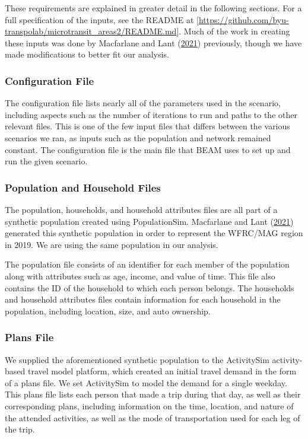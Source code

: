 \documentclass[
]{article}
\begin{document}
These requirements are explained in greater detail in the following sections. For a full specification of the inputs, see the README at {[}\url{https://github.com/byu-transpolab/microtransit_areas2/README.md}{]}. Much of the work in creating these inputs was done by Macfarlane and Lant (\protect\hyperlink{ref-MacfarlaneLant}{2021}) previously, though we have made modifications to better fit our analysis.

\hypertarget{configuration-file}{%
\subsubsection{Configuration File}\label{configuration-file}}

The configuration file lists nearly all of the parameters used in the scenario, including aspects such as the number of iterations to run and paths to the other relevant files. This is one of the few input files that differs between the various scenarios we ran, as inputs such as the population and network remained constant. The configuration file is the main file that BEAM uses to set up and run the given scenario.

\hypertarget{population-and-household-files}{%
\subsubsection{Population and Household Files}\label{population-and-household-files}}

The population, households, and household attributes files are all part of a synthetic population created using PopulationSim. Macfarlane and Lant (\protect\hyperlink{ref-MacfarlaneLant}{2021}) generated this synthetic population in order to represent the WFRC/MAG region in 2019. We are using the same population in our analysis.

The population file consists of an identifier for each member of the population along with attributes such as age, income, and value of time. This file also contains the ID of the household to which each person belongs. The households and household attributes files contain information for each household in the population, including location, size, and auto ownership.

\hypertarget{plans-file}{%
\subsubsection{Plans File}\label{plans-file}}

We supplied the aforementioned synthetic population to the ActivitySim activity-based travel model platform, which created an initial travel demand in the form of a plans file. We set ActivitySim to model the demand for a single weekday. This plans file lists each person that made a trip during that day, as well as their corresponding plans, including information on the time, location, and nature of the attended activities, as well as the mode of transportation used for each leg of the trip.
\end{document}
